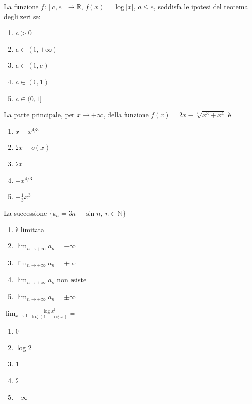 \begin{quiz}
La funzione $f:[a,e]\to\mathbb R$, $f(x)=\log|x|$, $a\leq e$, soddisfa le ipotesi del teorema degli zeri se:
\begin{enumerate}
\item $a>0$
\item $a\in(0,+\infty)$
\item $a\in(0,e)$
\item $a\in(0,1)$
\item $a\in(0,1]$
\end{enumerate}
\end{quiz}

\begin{quiz}
La parte principale, per $x\to+\infty$, della funzione $f(x)=2x-\sqrt[3]{x^3+x^4}$ \`e
\begin{enumerate}
\item $x-x^{4/3}$
\item $2x+o(x)$
\item $2x$
\item $-x^{4/3}$
\item $-\frac13x^3$
\end{enumerate}
\end{quiz}

\begin{quiz}
La successione $\{a_n=3n+\sin n,\ n\in\mathbb N\}$
\begin{enumerate}
\item \`e limitata
\item $\lim_{n\to+\infty}a_n=-\infty$
\item $\lim_{n\to+\infty}a_n=+\infty$
\item $\lim_{n\to+\infty}a_n$ non esiste
\item $\lim_{n\to+\infty}a_n=\pm\infty$
\end{enumerate}
\end{quiz}

\begin{quiz}
$\displaystyle\lim_{x\to1}\frac{\log x^2}{\log(1+\log x)}=$
\begin{enumerate}
\item $0$
\item $\log2$
\item $1$
\item $2$
\item $+\infty$
\end{enumerate}
\end{quiz}

